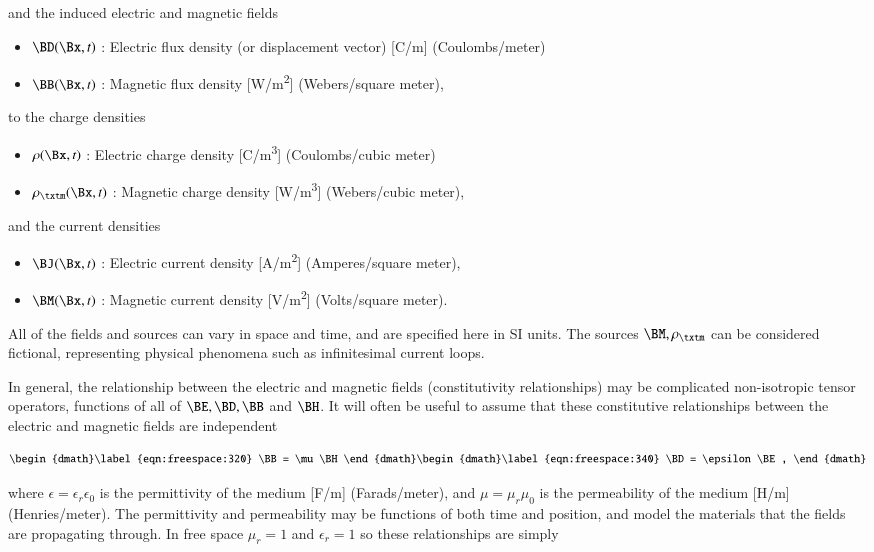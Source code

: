 and the induced electric and magnetic fields

\begin{itemize}
	\item \( \BD(\Bx, t) \) : Electric flux density (or displacement vector) [\si{C/m}] (Coulombs/meter)
	\item \( \BB(\Bx, t) \) : Magnetic flux density [\si{W/m^2}] (Webers/square meter),
\end{itemize}

to the charge densities

\begin{itemize}
	\item \( \rho(\Bx, t) \) : Electric charge density [\si{C/m^3}] (Coulombs/cubic meter)
   \item \( \rho_\txtm(\Bx, t) \) : Magnetic charge density [\si{W/m^3}] (Webers/cubic meter),
\end{itemize}

and the current densities

\begin{itemize}
	\item \( \BJ(\Bx, t) \) : Electric current density [\si{A/m^2}] (Amperes/square meter),
   \item \( \BM(\Bx, t) \) : Magnetic current density [\si{V/m^2}] (Volts/square meter).
\end{itemize}

All of the fields and sources can vary in space and time, and are specified here in SI units.
The sources \( \BM, \rho_\txtm \) can be considered fictional, representing physical phenomena such as infinitesimal current loops.

In general, the relationship between the electric and magnetic fields (constitutivity relationships) may be complicated
non-isotropic tensor operators, functions of all of \( \BE, \BD, \BB \) and \( \BH \).
It will often be useful to assume that these constitutive relationships between the electric and magnetic fields are independent

\begin{subequations}
\label{eqn:freespace:300}
\begin{dmath}\label{eqn:freespace:320}
\BB = \mu \BH
\end{dmath}
\begin{dmath}\label{eqn:freespace:340}
\BD = \epsilon \BE,
\end{dmath}
\end{subequations}

where \( \epsilon = \epsilon_r \epsilon_0 \) is the permittivity of the medium [\si{F/m}] (Farads/meter), and \( \mu = \mu_r \mu_0 \) is the permeability of the medium [\si{H/m}] (Henries/meter).
The permittivity and permeability may be functions of both time and position, and model the materials that the fields are propagating through.
In free space \( \mu_r = 1 \) and \( \epsilon_r = 1\) so these relationships are simply

